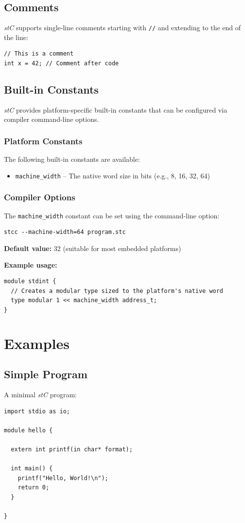 \documentclass[11pt,letterpaper,twoside,openany]{book}
\begin{document}
\section{Comments}
\emph{stC} supports single-line comments starting with \verb'//' and extending to the end of the line:
\begin{lstlisting}
// This is a comment
int x = 42; // Comment after code
\end{lstlisting}

\section{Built-in Constants}
\emph{stC} provides platform-specific built-in constants that can be configured via compiler command-line options.

\subsection{Platform Constants}
The following built-in constants are available:
\begin{itemize}
\item \verb'machine_width' -- The native word size in bits (e.g., 8, 16, 32, 64)
\end{itemize}

\subsection{Compiler Options}
The \verb'machine_width' constant can be set using the command-line option:

\begin{lstlisting}
stcc --machine-width=64 program.stc
\end{lstlisting}

\textbf{Default value:} 32 (suitable for most embedded platforms)

\textbf{Example usage:}
\begin{lstlisting}
module stdint {
  // Creates a modular type sized to the platform's native word
  type modular 1 << machine_width address_t;
}
\end{lstlisting}

\chapter{Examples}

\section{Simple Program}
A minimal \emph{stC} program:
\begin{lstlisting}
import stdio as io;

module hello {

  extern int printf(in char* format);

  int main() {
    printf("Hello, World!\n");
    return 0;
  }

}
\end{lstlisting}
\end{document}
